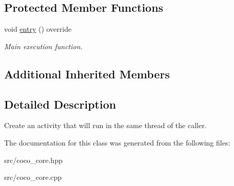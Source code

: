 \subsection*{Protected Member Functions}
\begin{DoxyCompactItemize}
\item 
\hypertarget{classcoco_1_1_sequential_activity_ac64d096bd0a06344cca6803c9874094d}{}void \hyperlink{classcoco_1_1_sequential_activity_ac64d096bd0a06344cca6803c9874094d}{entry} () override\label{classcoco_1_1_sequential_activity_ac64d096bd0a06344cca6803c9874094d}

\begin{DoxyCompactList}\small\item\em Main execution function. \end{DoxyCompactList}\end{DoxyCompactItemize}
\subsection*{Additional Inherited Members}


\subsection{Detailed Description}
Create an activity that will run in the same thread of the caller. 

The documentation for this class was generated from the following files\+:\begin{DoxyCompactItemize}
\item 
src/coco\+\_\+core.\+hpp\item 
src/coco\+\_\+core.\+cpp\end{DoxyCompactItemize}
